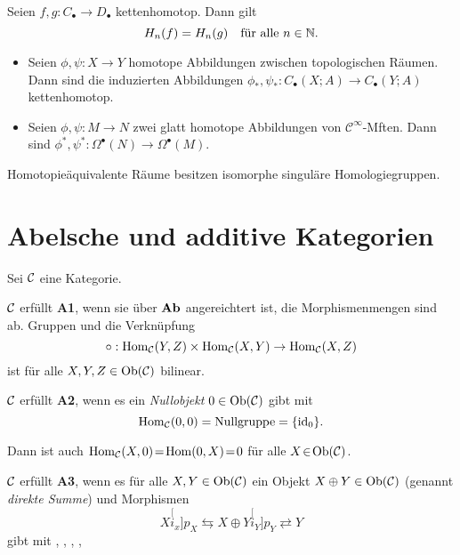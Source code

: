 \documentclass{cheat-sheet}
\newcommand{\CC}[1]{{#1}_{\bullet}} %
\newcommand{\Cont}{\mathcal{C}} %
\begin{document}
\begin{lem}
  Seien $f, g : \CC{C} \to \CC{D}$ kettenhomotop. Dann gilt
  \[ H_n(f) = H_n(g) \quad \text{für alle $n \in \mathbb{N}$.} \]
\end{lem}

\begin{prop}
  \begin{itemize}
    \item Seien $\phi, \psi : X \to Y$ homotope Abbildungen zwischen topologischen Räumen. Dann sind die induzierten Abbildungen $\phi_*, \psi_* : \CC{C}(X; A) \to \CC{C}(Y; A)$ kettenhomotop.
    \item Seien $\phi, \psi : M \to N$ zwei glatt homotope Abbildungen von $\Cont^\infty$-Mften. Dann sind $\phi^*, \psi^* : \Omega^\bullet(N) \to \Omega^\bullet(M)$.
  \end{itemize}
\end{prop}

\begin{kor}
  Homotopieäquivalente Räume besitzen isomorphe singuläre Homologiegruppen.
\end{kor}

\section{Abelsche und additive Kategorien}

Sei $\mathcal{C}$ eine Kategorie.

\begin{axiom}
  $\mathcal{C}$ erfüllt \textbf{A1}, wenn sie über $\mathbf{Ab}$ angereichtert ist, \dh{} die Morphismenmengen sind ab. Gruppen und die Verknüpfung
  \[ \circ : \operatorname{Hom}_{\mathcal{C}}(Y, Z) \times \operatorname{Hom}_{\mathcal{C}}(X, Y) \to \operatorname{Hom}_{\mathcal{C}}(X, Z) \]
  ist für alle $X, Y, Z \in \operatorname{Ob}(\mathcal{C})$ bilinear.
\end{axiom}

\begin{axiom}
  $\mathcal{C}$ erfüllt \textbf{A2}, wenn es ein \emph{Nullobjekt} $0 \in \operatorname{Ob}(\mathcal{C})$ gibt mit
  \[ \operatorname{Hom}_{\mathcal{C}}(0, 0) = \text{Nullgruppe} = \{ \operatorname{id}_0 \}. \]
\end{axiom}

\begin{bem}
  Dann ist auch $\operatorname{Hom}_{\mathcal{C}}(X, 0) \!=\! \operatorname{Hom}(0, X) \!=\! 0$ für alle $X \!\in\! \operatorname{Ob}(\mathcal{C})$.
\end{bem}

\begin{axiom}
  $\mathcal{C}$ erfüllt \textbf{A3}, wenn es für alle $X, Y \in \operatorname{Ob}(\mathcal{C})$ ein Objekt $X \oplus Y \in \operatorname{Ob}(\mathcal{C})$ (genannt \emph{direkte Summe}) und Morphismen
  \[ X \stackrel[i_x]{p_X}{\leftrightarrows} X \oplus Y \stackrel[i_Y]{p_Y}{\rightleftarrows} Y \]
  gibt mit
  , \enspace
  , \enspace
  , \enspace
  , \enspace
\end{axiom}
\end{document}
